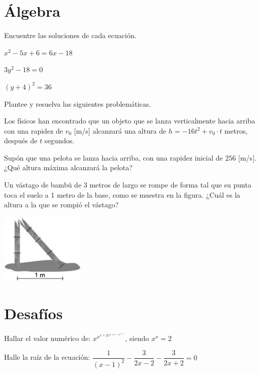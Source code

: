 \documentclass[sin curso]{srs}
\begin{document}
\section{Álgebra}
Encuentre las soluciones de cada ecuación.
\begin{preguntas}
  \pregunta $x^2-5x+6=6x-18$
  \begin{malla}[height=5cm]
  \end{malla}
  \pregunta $3y^2-18=0$
  \begin{malla}[height=5cm]
  \end{malla}
  \pregunta $(y+4)^2 = 36$
  \begin{malla}[height=5cm]
  \end{malla}
\end{preguntas}

Plantee y resuelva las siguientes problemáticas.
\begin{preguntas}
  \pregunta Los físicos han encontrado que un objeto que se lanza verticalmente hacia
  arriba con una rapidez de $v_0$ [m/s] alcanzará una altura de $h=-16t^2+v_0\cdot t$ metros,
  después de $t$ segundos. \par

  Supón que una pelota se lanza hacia arriba, con una rapidez inicial de $256$ [m/s].
  ¿Qué altura máxima alcanzará la pelota?
  \begin{malla}[height=8cm]
  \end{malla}
  \pregunta Un vástago de bambú de 3 metros de largo se rompe de forma tal que su
  punta toca el suelo a 1 metro de la base, como se muestra en la figura. ¿Cuál es
  la altura a la que se rompió el vástago?
\begin{center}
    \vspace*{5mm}
    \includegraphics[width=4cm]{vastago.png}
    \vspace*{5mm}
  \end{center}
  \begin{malla}[height=8cm]
  \end{malla}
\end{preguntas}

\section{Desafíos}
\begin{preguntas}
  \pregunta Hallar el valor numérico de: $x^{\displaystyle x^{\displaystyle 1+2x^{\displaystyle 1+x-x^{\displaystyle x+1}}}}$, siendo $x^x = 2$
  \begin{malla}[height=11.5cm]
  \end{malla}
  \pregunta Halle la raíz de la ecuación: $\dfrac{1}{(x-1)^2} -\dfrac{3}{2x-2} -\dfrac{3}{2x+2} = 0$
  \begin{malla}[height=11.5cm]
  \end{malla}

\end{preguntas}
\end{document}
